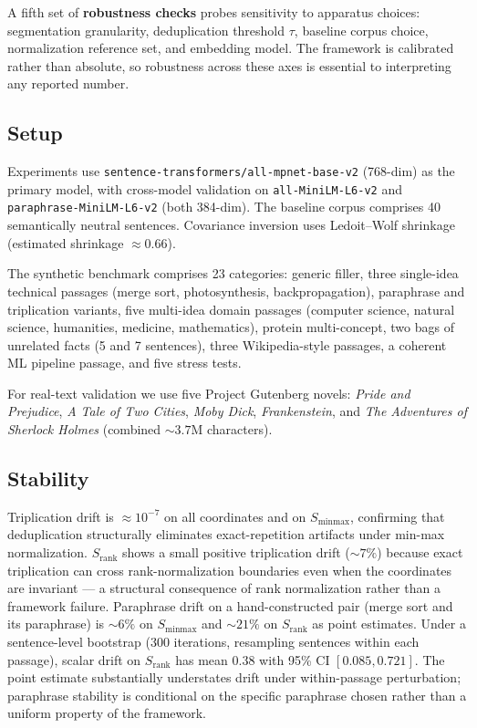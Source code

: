 \documentclass[11pt]{article}
\begin{document}
A fifth set of \textbf{robustness checks} probes sensitivity to apparatus choices: segmentation granularity, deduplication threshold $\tau$, baseline corpus choice, normalization reference set, and embedding model. The framework is calibrated rather than absolute, so robustness across these axes is essential to interpreting any reported number.

\subsection{Setup}

Experiments use \texttt{sentence-transformers/all-mpnet-base-v2} (768-dim) as the primary model, with cross-model validation on \texttt{all-MiniLM-L6-v2} and \texttt{paraphrase-MiniLM-L6-v2} (both 384-dim). The baseline corpus comprises 40 semantically neutral sentences. Covariance inversion uses Ledoit--Wolf shrinkage (estimated shrinkage $\approx 0.66$).

The synthetic benchmark comprises 23 categories: generic filler, three single-idea technical passages (merge sort, photosynthesis, backpropagation), paraphrase and triplication variants, five multi-idea domain passages (computer science, natural science, humanities, medicine, mathematics), protein multi-concept, two bags of unrelated facts (5 and 7 sentences), three Wikipedia-style passages, a coherent ML pipeline passage, and five stress tests.

For real-text validation we use five Project Gutenberg novels: \emph{Pride and Prejudice}, \emph{A Tale of Two Cities}, \emph{Moby Dick}, \emph{Frankenstein}, and \emph{The Adventures of Sherlock Holmes} (combined $\sim 3.7$M characters).

\subsection{Stability}

Triplication drift is $\approx 10^{-7}$ on all coordinates and on $S_{\mathrm{minmax}}$, confirming that deduplication structurally eliminates exact-repetition artifacts under min-max normalization. $S_{\mathrm{rank}}$ shows a small positive triplication drift ($\sim 7\%$) because exact triplication can cross rank-normalization boundaries even when the coordinates are invariant --- a structural consequence of rank normalization rather than a framework failure. Paraphrase drift on a hand-constructed pair (merge sort and its paraphrase) is $\sim 6\%$ on $S_{\mathrm{minmax}}$ and $\sim 21\%$ on $S_{\mathrm{rank}}$ as point estimates. Under a sentence-level bootstrap (300 iterations, resampling sentences within each passage), scalar drift on $S_{\mathrm{rank}}$ has mean $0.38$ with 95\% CI $[0.085, 0.721]$. The point estimate substantially understates drift under within-passage perturbation; paraphrase stability is conditional on the specific paraphrase chosen rather than a uniform property of the framework.
\end{document}
